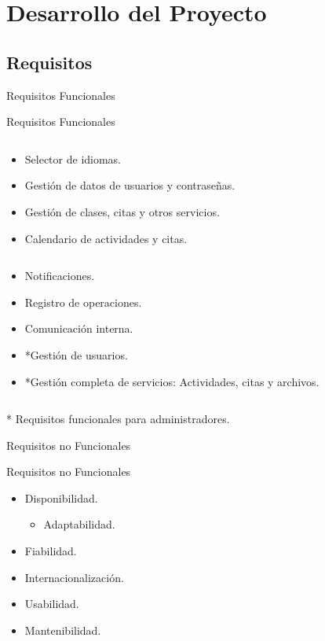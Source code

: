 \documentclass[spanish,xcolor=table,svgnames]{beamer}
\begin{document}
\section{Desarrollo del Proyecto}

\subsection*{Requisitos}
\begin{frame}{Requisitos Funcionales}
  \begin{block}{Requisitos Funcionales}
    \begin{column}{0.5\textwidth}
  \begin{itemize}
    \item Selector de idiomas.
    \item Gestión de datos de usuarios y contraseñas.
    \item Gestión de clases, citas y otros servicios.
    \item Calendario de actividades y citas.
  \end{itemize}
    \end{column}
    \begin{column}{0.5\textwidth}
  \begin{itemize}
    \item Notificaciones.
    \item Registro de operaciones.
    \item Comunicación interna.
    \item *Gestión de usuarios.
    \item *Gestión completa de servicios: Actividades, citas y archivos.
  \end{itemize}
    \end{column}
  \end{block}
  * Requisitos funcionales para administradores.
\end{frame}

\begin{frame}{Requisitos no Funcionales}
  \begin{block}{Requisitos no Funcionales}
  \begin{itemize}
    \item Disponibilidad.
  \begin{itemize}
    \item Adaptabilidad.
  \end{itemize}
    \item Fiabilidad.
    \item Internacionalización.
    \item Usabilidad.
    \item Mantenibilidad.
  \end{itemize}
  \end{block}
\end{frame}
\end{document}
